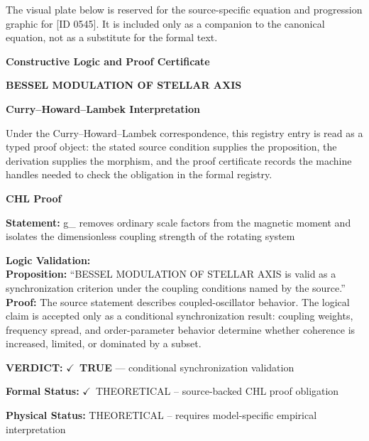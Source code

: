 \begingroup\footnotesize\sloppy
The visual plate below is reserved for the source-specific equation and progression graphic for [ID 0545]. It is included only as a companion to the canonical equation, not as a substitute for the formal text.
\par\endgroup
\ifTZPDarkEdition
{}
\fi

\clearpage
\begingroup\tzpsupportsetup
\noindent\textbf{\fontsize{10.8pt}{12.8pt}\selectfont [ID 0545] Constructive Logic and Proof Certificate}\par
\noindent\textbf{\fontsize{10pt}{12pt}\selectfont BESSEL MODULATION OF STELLAR AXIS}\par
\vspace{0.45em}
\begingroup
\footnotesize
\setlength{\parskip}{0.22em}
\setlength{\parindent}{0pt}
\noindent\textbf{Curry--Howard--Lambek Interpretation}\par
Under the Curry--Howard--Lambek correspondence, this registry entry is read as a typed proof
object: the stated source condition supplies the proposition, the derivation supplies the
morphism, and the proof certificate records the machine handles needed to check the obligation
in the formal registry.

\vspace{0.45em}
\noindent\textbf{CHL Proof}\par
\textbf{Statement:} g\_ removes ordinary scale factors from the magnetic moment and isolates the
dimensionless coupling strength of the rotating system

\textbf{Logic Validation:}\\
\textbf{Proposition:} ``BESSEL MODULATION OF STELLAR AXIS is valid as a synchronization criterion under the
coupling conditions named by the source.''\\
\textbf{Proof:} The source statement describes coupled-oscillator behavior. The logical claim is
accepted only as a conditional synchronization result: coupling weights, frequency
spread, and order-parameter behavior determine whether coherence is increased, limited,
or dominated by a subset.

\textbf{VERDICT:} \ensuremath{\checkmark}\ \textbf{TRUE} --- conditional synchronization validation

\textbf{Formal Status:} \ensuremath{\checkmark}\ THEORETICAL -- source-backed CHL proof obligation

\textbf{Physical Status:} THEORETICAL -- requires model-specific empirical interpretation
\par\vspace{0.45em}
\par
\ifTZPDarkEdition
{}
\fi
\endgroup
\endgroup
